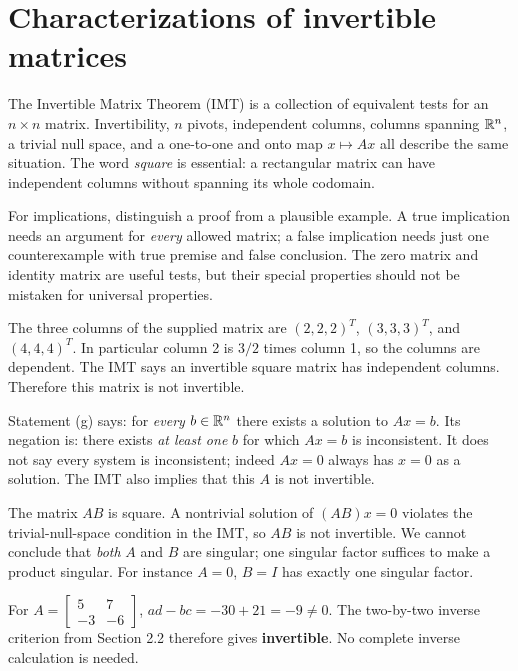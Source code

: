 \section{Characterizations of invertible matrices}
The Invertible Matrix Theorem (IMT) is a collection of equivalent tests for
an $n\times n$ matrix. Invertibility, $n$ pivots, independent columns,
columns spanning $\mathbb{R}^n$, a trivial null space, and a one-to-one and onto
map $x\mapsto Ax$ all describe the same situation. The word
\emph{square} is essential: a rectangular matrix can have independent
columns without spanning its whole codomain.

For implications, distinguish a proof from a plausible example. A true
implication needs an argument for \emph{every} allowed matrix; a false
implication needs just one counterexample with true premise and false
conclusion. The zero matrix and identity matrix are useful tests, but their
special properties should not be mistaken for universal properties.

The three columns of the supplied matrix are $(2,2,2)^T$,
$(3,3,3)^T$, and $(4,4,4)^T$. In particular column 2 is $3/2$ times
column 1, so the columns are dependent. The IMT says an invertible square
matrix has independent columns. Therefore this matrix is not invertible.

Statement (g) says: for \emph{every} $b\in\mathbb{R}^n$ there exists a solution
to $Ax=b$. Its negation is: there exists \emph{at least one} $b$ for which
$Ax=b$ is inconsistent. It does not say every system is inconsistent;
indeed $Ax=0$ always has $x=0$ as a solution. The IMT also implies that
this $A$ is not invertible.

The matrix $AB$ is square. A nontrivial solution of $(AB)x=0$ violates
the trivial-null-space condition in the IMT, so $AB$ is not invertible.
We cannot conclude that \emph{both} $A$ and $B$ are singular; one singular
factor suffices to make a product singular. For instance $A=0$, $B=I$
has exactly one singular factor.

For $A=\begin{bmatrix}5&7\\-3&-6\end{bmatrix}$,
$ad-bc=-30+21=-9\ne0$. The two-by-two inverse criterion from Section 2.2
therefore gives \textbf{invertible}. No complete inverse calculation is needed.

